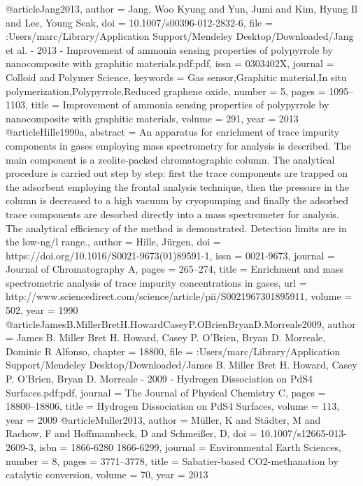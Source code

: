 @article{Jang2013,
author = {Jang, Woo Kyung and Yun, Jumi and Kim, Hyung Il and Lee, Young Seak},
doi = {10.1007/s00396-012-2832-6},
file = {:Users/marc/Library/Application Support/Mendeley Desktop/Downloaded/Jang et al. - 2013 - Improvement of ammonia sensing properties of polypyrrole by nanocomposite with graphitic materials.pdf:pdf},
issn = {0303402X},
journal = {Colloid and Polymer Science},
keywords = {Gas sensor,Graphitic material,In situ polymerization,Polypyrrole,Reduced graphene oxide},
number = {5},
pages = {1095--1103},
title = {{Improvement of ammonia sensing properties of polypyrrole by nanocomposite with graphitic materials}},
volume = {291},
year = {2013}
}
@article{Hille1990a,
abstract = {An apparatus for enrichment of trace impurity components in gases employing mass spectrometry for analysis is described. The main component is a zeolite-packed chromatographic column. The analytical procedure is carried out step by step: first the trace components are trapped on the adsorbent employing the frontal analysis technique, then the pressure in the column is decreased to a high vacuum by cryopumping and finally the adsorbed trace components are desorbed directly into a mass spectrometer for analysis. The analytical efficiency of the method is demonstrated. Detection limits are in the low-ng/l range.},
author = {Hille, J{\"{u}}rgen},
doi = {https://doi.org/10.1016/S0021-9673(01)89591-1},
issn = {0021-9673},
journal = {Journal of Chromatography A},
pages = {265--274},
title = {{Enrichment and mass spectrometric analysis of trace impurity concentrations in gases}},
url = {http://www.sciencedirect.com/science/article/pii/S0021967301895911},
volume = {502},
year = {1990}
}
@article{JamesB.MillerBretH.HowardCaseyP.OBrienBryanD.Morreale2009,
author = {{James B. Miller  Bret H. Howard, Casey P. O'Brien, Bryan D. Morreale}, Dominic R Alfonso},
chapter = {18800},
file = {:Users/marc/Library/Application Support/Mendeley Desktop/Downloaded/James B. Miller Bret H. Howard, Casey P. O'Brien, Bryan D. Morreale - 2009 - Hydrogen Dissociation on PdS4 Surfaces.pdf:pdf},
journal = {The Journal of Physical Chemistry C},
pages = {18800--18806},
title = {{Hydrogen Dissociation on PdS4 Surfaces}},
volume = {113},
year = {2009}
}
@article{Muller2013,
author = {M{\"{u}}ller, K and St{\"{a}}dter, M and Rachow, F and Hoffmannbeck, D and Schmei{\ss}er, D},
doi = {10.1007/s12665-013-2609-3},
isbn = {1866-6280
1866-6299},
journal = {Environmental Earth Sciences},
number = {8},
pages = {3771--3778},
title = {{Sabatier-based CO2-methanation by catalytic conversion}},
volume = {70},
year = {2013}
}
